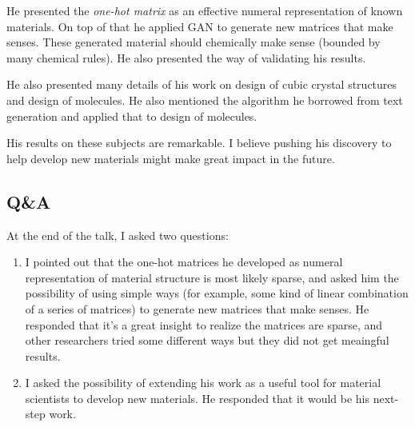 \documentclass[11pt, oneside]{article}   	%
\begin{document}
He presented the \emph{one-hot matrix} as an effective numeral
representation of known materials. On top of that he applied GAN to
generate new matrices that make senses. These generated material
should chemically make sense (bounded by many chemical rules). He also
presented the way of validating his results.


He also presented many details of his work on design of cubic crystal
structures and design of molecules. He also mentioned the algorithm he
borrowed from text generation and applied that to design of
molecules.


His results on these subjects are remarkable. I believe pushing his
discovery to help develop new materials might make great impact in the
future.



\subsection{Q\&A}
At the end of the talk, I asked two questions: 
\begin{enumerate}
\item I pointed out that the one-hot matrices he developed as numeral
  representation of material structure is most likely sparse, and
  asked him the possibility of using simple ways (for example, some
  kind of linear combination of a series of matrices) to generate new
  matrices that make senses. He responded that it's a great insight to
  realize the matrices are sparse, and other researchers tried some
  different ways but they did not get meaingful results.
  
\item I asked the possibility of extending his work as a useful tool
  for material scientists to develop new materials. He responded that
  it would be his next-step work.
  
\end{enumerate}

%
%
%
%
%
%

%
%
\end{document}
